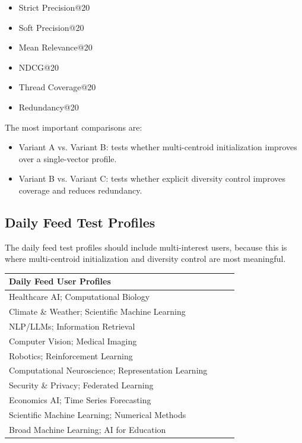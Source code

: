 \documentclass[11pt]{article}
\begin{document}
\begin{itemize}[leftmargin=*]
    \item Strict Precision@20
    \item Soft Precision@20
    \item Mean Relevance@20
    \item NDCG@20
    \item Thread Coverage@20
    \item Redundancy@20
\end{itemize}

The most important comparisons are:

\begin{itemize}[leftmargin=*]
    \item Variant A vs. Variant B: tests whether multi-centroid initialization improves over a single-vector profile.
    \item Variant B vs. Variant C: tests whether explicit diversity control improves coverage and reduces redundancy.
\end{itemize}

\subsection{Daily Feed Test Profiles}

The daily feed test profiles should include multi-interest users, because this is where multi-centroid initialization and diversity control are most meaningful.

\begin{longtable}{p{0.9\linewidth}}
\toprule
\textbf{Daily Feed User Profiles} \\
\midrule
Healthcare AI; Computational Biology \\
Climate \& Weather; Scientific Machine Learning \\
NLP/LLMs; Information Retrieval \\
Computer Vision; Medical Imaging \\
Robotics; Reinforcement Learning \\
Computational Neuroscience; Representation Learning \\
Security \& Privacy; Federated Learning \\
Economics AI; Time Series Forecasting \\
Scientific Machine Learning; Numerical Methods \\
Broad Machine Learning; AI for Education \\
\bottomrule
\end{longtable}
\end{document}
